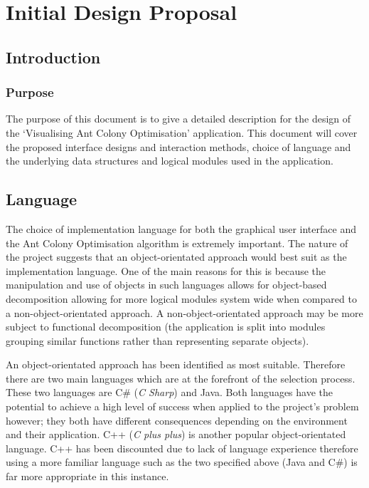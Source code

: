 \chapter{Initial Design Proposal}
\renewcommand{\thechapter}{\Alph{chapter}}
\section{Introduction}

\subsection{Purpose}

The purpose of this document is to give a detailed description for the design of the ‘Visualising Ant Colony Optimisation' application. This document will cover the proposed interface designs and interaction methods, choice of language and the underlying data structures and logical modules used in the application.

\section{Language}
\label{lang}
The choice of implementation language for both the graphical user interface and the Ant Colony Optimisation algorithm is extremely important. The nature of the project suggests that an object-orientated approach would best suit as the implementation language. One of the main reasons for this is because the manipulation and use of objects in such languages allows for object-based decomposition allowing for more logical modules system wide when compared to a non-object-orientated approach. A non-object-orientated approach may be more subject to functional decomposition (the application is split into modules grouping similar functions rather than representing separate objects).

An object-orientated approach has been identified as most suitable. Therefore there are two main languages which are at the forefront of the selection process. These two languages are C\# (\textit{C Sharp}) and Java. Both languages have the potential to achieve a high level of success when applied to the project’s problem however; they both have different consequences depending on the environment and their application. C++ (\textit{C plus plus}) is another popular object-orientated language. C++ has been discounted due to lack of language experience therefore using a more familiar language such as the two specified above (Java and C\#) is far more appropriate in this instance. 

